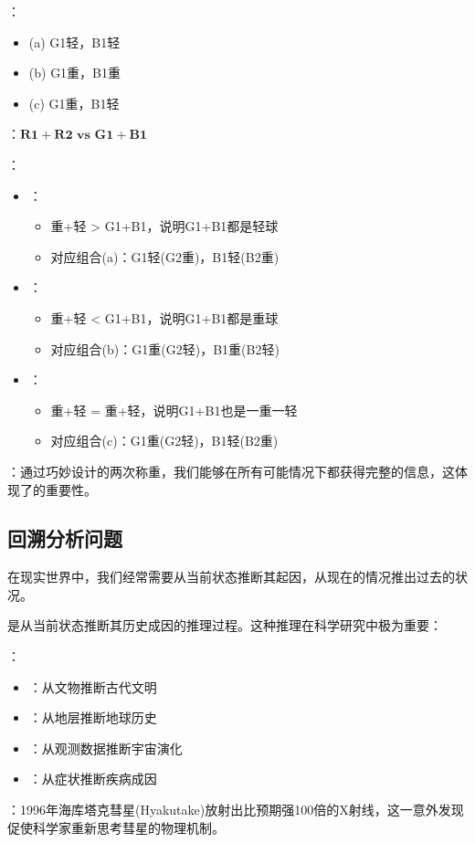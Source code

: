 \begin{theorembox}[title=可能的组合分析]
：
\begin{itemize}
  \item (a) G1轻，B1轻
  \item (b) G1重，B1重
  \item (c) G1重，B1轻
\end{itemize}

：$\mathbf{R1 + R2 \text{ vs } G1 + B1}$

：
\begin{itemize}
  \item {}：
    \begin{itemize}
      \item 重+轻 > G1+B1，说明G1+B1都是轻球
      \item 对应组合(a)：G1轻(G2重)，B1轻(B2重)
    \end{itemize}
  \item {}：
    \begin{itemize}
      \item 重+轻 < G1+B1，说明G1+B1都是重球
      \item 对应组合(b)：G1重(G2轻)，B1重(B2轻)
    \end{itemize}
  \item {}：
    \begin{itemize}
      \item 重+轻 = 重+轻，说明G1+B1也是一重一轻
      \item 对应组合(c)：G1重(G2轻)，B1轻(B2重)
    \end{itemize}
\end{itemize}
\end{theorembox}

：通过巧妙设计的两次称重，我们能够在所有可能情况下都获得完整的信息，这体现了的重要性。

\subsection{回溯分析问题}

在现实世界中，我们经常需要从当前状态推断其起因，从现在的情况推出过去的状况。

是从当前状态推断其历史成因的推理过程。这种推理在科学研究中极为重要：

\begin{theorembox}[title=回溯分析的应用领域]
：
\begin{itemize}
  \item {}：从文物推断古代文明
  \item {}：从地层推断地球历史
  \item {}：从观测数据推断宇宙演化
  \item {}：从症状推断疾病成因
\end{itemize}

：1996年海库塔克彗星(Hyakutake)放射出比预期强100倍的X射线，这一意外发现促使科学家重新思考彗星的物理机制。
\end{theorembox}

